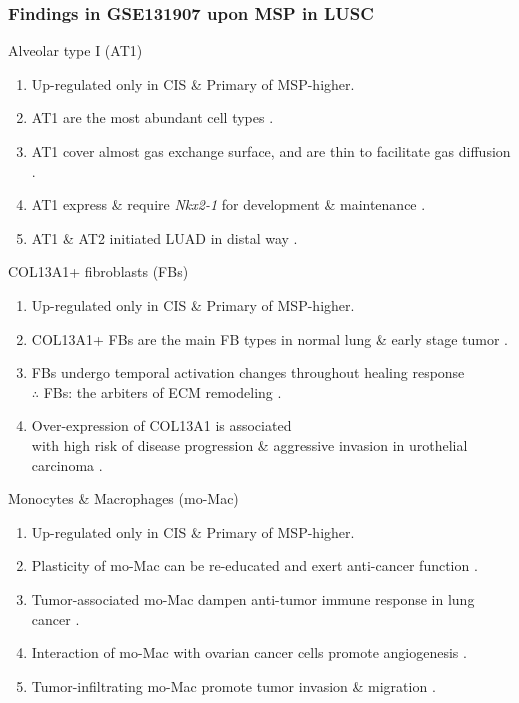 \documentclass{beamer}
\begin{document}
    \begin{frame}[allowframebreaks]
        \frametitle{Findings in GSE131907 upon MSP in LUSC}

        \begin{block}{Alveolar type I (AT1)}
            \begin{enumerate}
                \item Up-regulated only in CIS \& Primary of MSP-higher.
                \item AT1 are the most abundant cell types \cite{singlecell1}.
                \item AT1 cover almost gas exchange surface, and are thin to facilitate gas diffusion \cite{AT1-2}.
                \item AT1 express \& require \textit{Nkx2-1} for development \& maintenance \cite{AT1-3}.
                \item AT1 \& AT2 initiated LUAD in distal way \cite{AT1-1}.
            \end{enumerate}
        \end{block}

        \begin{block}{COL13A1+ fibroblasts (FBs)}
            \begin{enumerate}
                \item Up-regulated only in CIS \& Primary of MSP-higher.
                \item COL13A1+ FBs are the main FB types in normal lung \& early stage tumor \cite{singlecell1}.
                \item FBs undergo temporal activation changes throughout healing response \\
                    $\therefore$ FBs: the arbiters of ECM remodeling \cite{FB-1}.
                \item Over-expression of COL13A1 is associated \\
                    with high risk of disease progression \& aggressive invasion in urothelial carcinoma \cite{COL13A1-1}.
            \end{enumerate}
        \end{block}

        \begin{block}{Monocytes \& Macrophages (mo-Mac)}
            \begin{enumerate}
                \item Up-regulated only in CIS \& Primary of MSP-higher.
                \item Plasticity of mo-Mac can be re-educated and exert anti-cancer function \cite{moMac-2}.
                \item Tumor-associated mo-Mac dampen anti-tumor immune response in lung cancer \cite{moMac-1}.
                \item Interaction of mo-Mac with ovarian cancer cells promote angiogenesis \cite{moMac-3}.
                \item Tumor-infiltrating mo-Mac promote tumor invasion \& migration \cite{moMac-4}.
            \end{enumerate}
        \end{block}


\end{frame}
\end{document}
